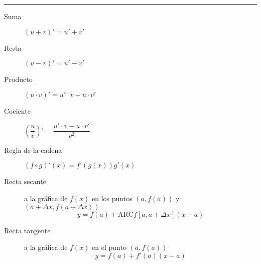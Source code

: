 \begin{multicols}{2}
\begin{tcolorbox}[hbox, title=Álgebra de derivadas]
\begin{minipage}{0.4\textwidth}
\flushleft
\rule{0.4\textwidth}{0pt}
\begin{description}
\item[Suma] $(u+v)'=u'+v'$
\item[Resta] $(u-v)'=u'-v'$
\item[Producto] $(u\cdot v)'=u'\cdot v+ u\cdot v'$
\item[Cociente] $\left(\dfrac{u}{v}\right)'=\dfrac{u'\cdot v-u\cdot v'}{v^2}$
\item[Regla de la cadena] $(f\circ g)'(x)=f'(g(x))g'(x)$
\end{description}
\end{minipage}
\end{tcolorbox}

\begin{tcolorbox}[hbox, title=Rectas secante y tangente]
\begin{minipage}{0.4\textwidth}
\flushleft
\begin{description}
\item[Recta secante] a la gráfica de $f(x)$ en los puntos $(a,f(a))$ y $(a+\Delta x, f(a+\Delta x))$
      \[
      y=f(a)+\mbox{ARC}f[a,a+\Delta x](x-a)
      \]
\item[Recta tangente] a la gráfica de $f(x)$ en el punto $(a,f(a))$
      \[
      y=f(a)+f'(a)(x-a)
      \]
\end{description}
\end{minipage}
\end{tcolorbox}


\end{multicols}
